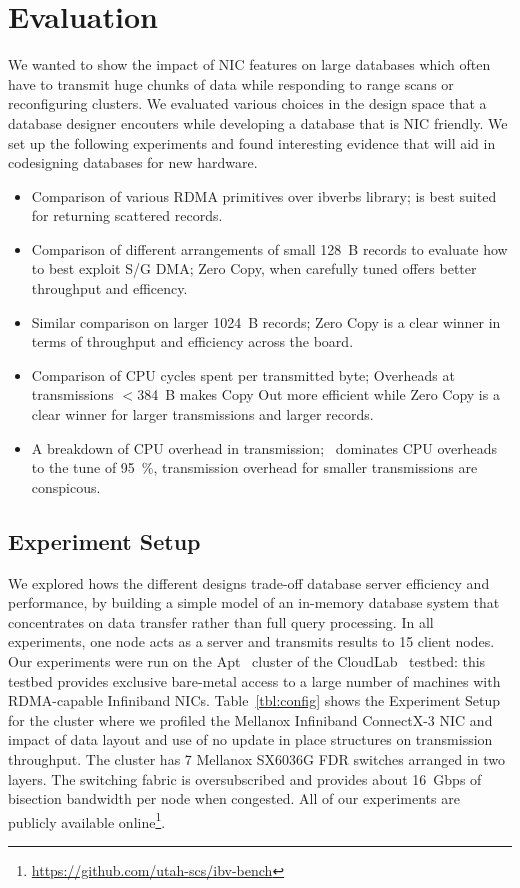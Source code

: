 \section{Evaluation}
We wanted to show the impact of NIC features on large databases which often have to 
transmit huge chunks of data while responding to range scans or reconfiguring clusters. 
We evaluated various choices in the design space that a database designer encouters while developing 
a database that is NIC friendly. We set up the following experiments and found interesting 
evidence that will aid in codesigning databases for new hardware.
\begin{itemize}
\item Comparison of various RDMA primitives over ibverbs library;  is best suited for returning scattered records.
\item Comparison of different arrangements of small 128~B records to evaluate how to best exploit S/G DMA; Zero Copy, when carefully tuned offers better throughput and efficency.
\item Similar comparison on larger 1024~B records; Zero Copy is a clear winner in terms of throughput and efficiency across the board.
\item Comparison of CPU cycles spent per transmitted byte; Overheads at transmissions $<$384~B makes Copy Out more efficient while Zero Copy is a clear winner for larger transmissions and larger records.
\item A breakdown of CPU overhead in transmission; \memcpy ~dominates CPU overheads to the tune of 95~\%, transmission overhead for smaller transmissions are conspicous.
\end{itemize}




\subsection{Experiment Setup}

We explored hows the different designs trade-off database server efficiency and
performance, by building a simple model of an in-memory database system that
concentrates on data transfer rather than full query processing. In all experiments,
one node acts as a server and transmits results to 15 client nodes.
Our experiments were run on the Apt~\cite{Ricci+:OSR15} cluster of the
CloudLab~\cite{Cloudlab:URL} testbed: this testbed provides exclusive bare-metal
access to a large number of machines with RDMA-capable Infiniband NICs.
Table~\ref{tbl:config} shows the Experiment Setup for the cluster where we profiled
the Mellanox Infiniband ConnectX-3 \textregistered NIC and impact of data layout and 
use of no update in place structures on transmission throughput. The cluster has 7
Mellanox SX6036G FDR switches arranged in two layers. The switching fabric is
oversubscribed and provides about 16~Gbps of bisection bandwidth per node
when congested. All of our experiments are publicly available online\footnote{\url{https://github.com/utah-scs/ibv-bench}}.




